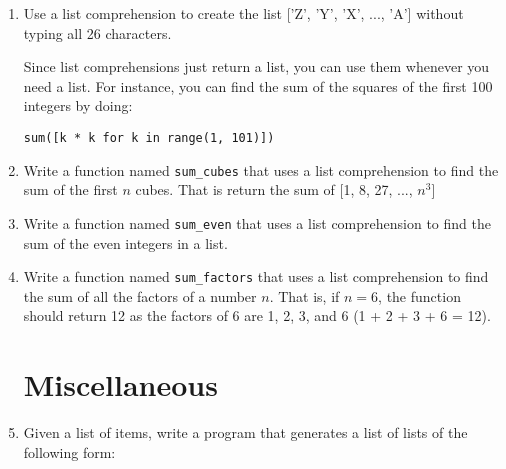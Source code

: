 \documentclass[12pt]{article}
\begin{document}
\begin{enumerate}
\item Use a list comprehension to create the list ['Z', 'Y', 'X', ..., 'A'] without typing all 26 characters.

Since list comprehensions just return a list, you can use them whenever you need a list. For instance, you can find the sum of the squares of the first 100 integers by doing: 

\begin{verbatim}
sum([k * k for k in range(1, 101)])
\end{verbatim}



\item Write a function named \texttt{sum\_cubes} that uses a list comprehension to find the sum of the first $n$ cubes. That is return the sum of [1, 8, 27, ..., $n^3$]

\item Write a function named \texttt{sum\_even} that uses a list comprehension to find the sum of the even integers in a list.

\item Write a function named \texttt{sum\_factors} that uses a list comprehension to find the sum of all the factors of a number $n$. That is, if $n = 6$, the function should return 12 as the factors of 6 are 1, 2, 3, and 6 (1 + 2 + 3 + 6 = 12).

  \section*{Miscellaneous}



\item Given a list of items, write a program that generates a list of lists of the following form:


\end{enumerate}
\end{document}
